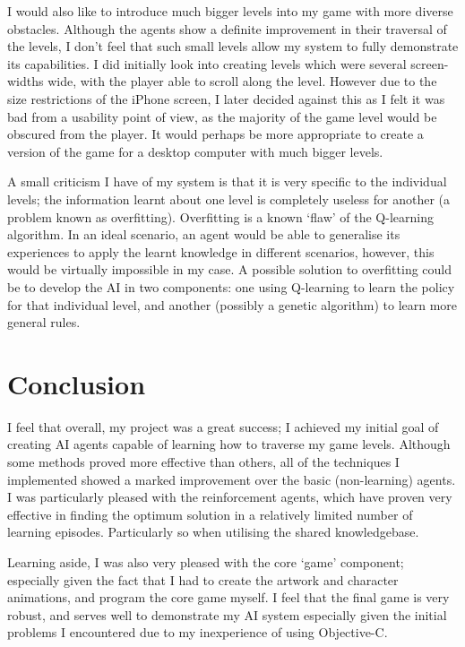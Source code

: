 \documentclass[a4paper,oneside]{report}
\begin{document}
I would also like to introduce much bigger levels into my game with more diverse obstacles. Although the agents show a definite improvement in their traversal of the levels, I don't feel that such small levels allow my system to fully demonstrate its capabilities. I did initially look into creating levels which were several screen-widths wide, with the player able to scroll along the level. However due to the size restrictions of the iPhone screen, I later decided against this as I felt it was bad from a usability point of view, as the majority of the game level would be obscured from the player. It would perhaps be more appropriate to create a version of the game for a desktop computer with much bigger levels.

A small criticism I have of my system is that it is very specific to the individual levels; the information learnt about one level is completely useless for another (a problem known as overfitting). Overfitting is a known `flaw' of the Q-learning algorithm. In an ideal scenario, an agent would be able to generalise its experiences to apply the learnt knowledge in different scenarios, however, this would be virtually impossible in my case. A possible solution to overfitting could be to develop the AI in two components: one using Q-learning to learn the policy for that individual level, and another (possibly a genetic algorithm) to learn more general rules. 

\section{Conclusion}

I feel that overall, my project was a great success; I achieved my initial goal of creating AI agents capable of learning how to traverse my game levels. Although some methods proved more effective than others, all of the techniques I implemented showed a marked improvement over the basic (non-learning) agents. I was particularly pleased with the reinforcement agents, which have proven very effective in finding the optimum solution in a relatively limited number of learning episodes. Particularly so when utilising the shared knowledgebase. 

Learning aside, I was also very pleased with the core `game' component; especially given the fact that I had to create the artwork and character animations, and program the core game myself. I feel that the final game is very robust, and serves well to demonstrate my AI system especially given the initial problems I encountered due to my inexperience of using Objective-C.
\end{document}
